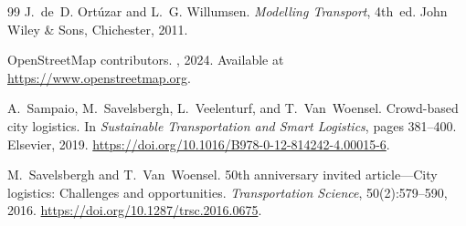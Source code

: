 \documentclass[11pt,a4paper]{article}
\newcommand{\doi}[1]{\url{https://doi.org/#1}}
\begin{document}
\begin{thebibliography}{99}
J.~de~D. Ort\'{u}zar and L.~G. Willumsen.
\newblock \emph{Modelling Transport}, 4th~ed.
\newblock John Wiley \& Sons, Chichester, 2011.

{OpenStreetMap contributors}.
, 2024.
\newblock Available at \url{https://www.openstreetmap.org}.

A.~Sampaio, M.~Savelsbergh, L.~Veelenturf, and T.~Van~Woensel.
\newblock Crowd-based city logistics.
\newblock In \emph{Sustainable Transportation and Smart Logistics},
  pages 381--400. Elsevier, 2019.
\newblock \doi{10.1016/B978-0-12-814242-4.00015-6}.

M.~Savelsbergh and T.~Van~Woensel.
\newblock 50th anniversary invited article---{City} logistics: Challenges and
  opportunities.
\newblock \emph{Transportation Science}, 50(2):579--590, 2016.
\newblock \doi{10.1287/trsc.2016.0675}.

\end{thebibliography}
\end{document}
